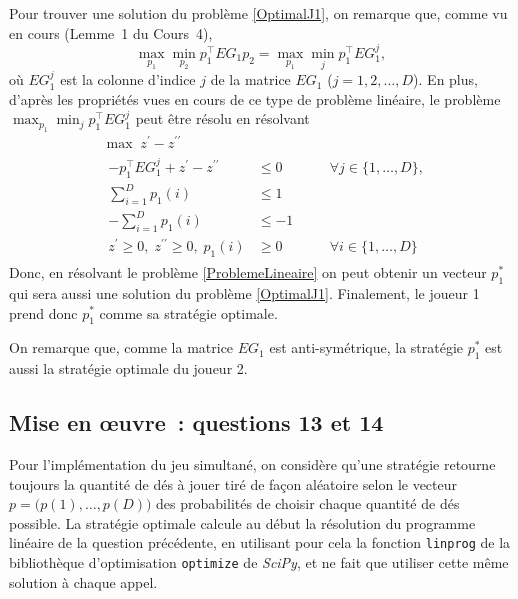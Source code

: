 \documentclass[a4paper,11pt]{amsart}
\theoremstyle{plain}
\begin{document}
Pour trouver une solution du problème \eqref{OptimalJ1}, on remarque que, comme vu en cours (Lemme~1 du Cours~4),
\[
\max_{p_1} \min_{p_2} p_1^\top EG_1 p_2 = \max_{p_1} \min_{j} p_1^\top EG_1^j,
\]
où $EG_1^j$ est la colonne d'indice $j$ de la matrice $EG_1$ ($j = 1, 2, \dotsc, D$). En plus, d'après les propriétés vues en cours de ce type de problème linéaire, le problème $\max_{p_1} \min_{j} p_1^\top EG_1^j$ peut être résolu en résolvant
\begin{equation}
\label{ProblemeLineaire}
\begin{aligned}
& \max\; z^\prime - z^{\prime\prime} \\
& \begin{aligned}
- p_1^\top EG_1^j + z^\prime - z^{\prime\prime} & \leq 0 & \quad & \forall j \in \{1, \dotsc, D\}, \\
\textstyle\sum_{i=1}^D p_1(i) & \leq 1 \\
\textstyle-\sum_{i=1}^D p_1(i) & \leq -1 \\
z^\prime \geq 0,\; z^{\prime\prime}\geq 0,\; p_1(i) & \geq 0 & & \forall i \in \{1, \dotsc, D\}
\end{aligned}
\end{aligned}
\end{equation}
Donc, en résolvant le problème \eqref{ProblemeLineaire} on peut obtenir un vecteur $p_1^\ast$ qui sera aussi une solution du problème \eqref{OptimalJ1}. Finalement, le joueur 1 prend donc $p_1^\ast$ comme sa stratégie optimale.

On remarque que, comme la matrice $EG_1$ est anti-symétrique, la stratégie $p_1^\ast$ est aussi la stratégie optimale du joueur 2.

\subsection{Mise en \oe{}uvre~: questions 13 et 14}

Pour l'implémentation du jeu simultané, on considère qu'une stratégie retourne toujours la quantité de dés à jouer tiré de façon aléatoire selon le vecteur $p = \bigl(p(1), \dotsc, p(D)\bigr)$ des probabilités de choisir chaque quantité de dés possible. La stratégie optimale calcule au début la résolution du programme linéaire de la question précédente, en utilisant pour cela la fonction \texttt{linprog} de la bibliothèque d'optimisation \texttt{optimize} de \emph{SciPy}, et ne fait que utiliser cette même solution à chaque appel. 
\end{document}
